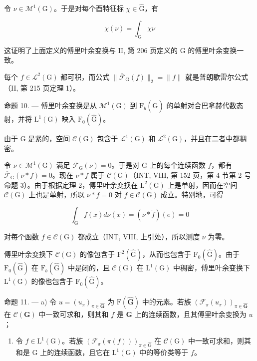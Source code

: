 令 \(\nu \in \mathcal{M}^1 (\mathrm{G})\)。于是对每个酉特征标 \(\chi \in \widehat{\mathrm{G}}\)，有

\[
\chi (\nu) = \int_ {\mathrm{G}} \chi \nu
\]

这证明了上面定义的傅里叶余变换与 II, 第 206 页定义的 G 的傅里叶余变换一致。

每个 \(f \in \mathcal{L}^2(\mathrm{G})\) 都可积，而公式 \(\| \overline{\mathcal{F}}_{\mathrm{G}}(f)\| _2 = \| f\|\) 就是普朗歇雷尔公式（II, 第 215 页定理 1）。

命题 10. --- 傅里叶余变换是从 \(\mathcal{M}^{1}(\mathrm{G})\) 到 \(\mathrm{F}_{b}(\widehat{\mathrm{G}})\) 的单射对合巴拿赫代数态射，并将 \(\mathrm{L}^{1}(\mathrm{G})\) 映入 \(\mathrm{F}_{0}(\widehat{\mathrm{G}})\)。

由于 G 是紧的，空间 \(\mathcal{C}(\mathrm{G})\) 包含于 \(\mathcal{L}^{1}(\mathrm{G})\) 和 \(\mathcal{L}^{2}(\mathrm{G})\)，并且在二者中都稠密。

令 \(\nu \in \mathcal{M}^1 (\mathrm{G})\) 满足 \(\overline{\mathcal{F}}_{\mathrm{G}}(\nu) = 0\)。于是对 G 上的每个连续函数 \(f\)，都有 \(\overline{\mathcal{F}}_{\mathrm{G}}(\nu *f) = 0\)。现在 \(\nu *f\) 属于 \(\mathcal{C}(\mathrm{G})\)（INT, VIII, 第 152 页，第 4 节第 2 号命题 3）。由于根据定理 2，傅里叶余变换在 \(\mathrm{L}^2 (\mathrm{G})\) 上是单射，因而在空间 \(\mathcal{C}(\mathrm{G})\) 上也是单射，所以 \(\nu *f = 0\) 对 \(f\in \mathcal{C}(\mathrm{G})\) 成立。特别地，可得

\[
\int_ {\mathrm{G}} f (x) d \nu (x) = (\nu * \check {f}) (e) = 0
\]

对每个函数 \(f \in \mathcal{C}(\mathrm{G})\) 都成立（INT, VIII, 上引处），所以测度 \(\nu\) 为零。

傅里叶余变换下 \(\mathcal{C}(\mathrm{G})\) 的像包含于 \(\mathrm{F}^2 (\widehat{\mathrm{G}})\)，从而也包含于 \(\mathrm{F}_0(\widehat{\mathrm{G}})\)。由于 \(\mathrm{F}_0(\widehat{\mathrm{G}})\) 在 \(\mathrm{F}_b(\widehat{\mathrm{G}})\) 中是闭的，且 \(\mathcal{C}(\mathrm{G})\) 在 \(\mathrm{L}^1 (\mathrm{G})\) 中稠密，傅里叶余变换下 \(\mathrm{L}^1 (\mathrm{G})\) 的像也包含于 \(\mathrm{F}_0(\widehat{\mathrm{G}})\)。

命题 11. --- a) 令 \(u = (u_{\pi})_{\pi \in \widehat{\mathbf{G}}}\) 为 \(\mathrm{F}(\widehat{\mathbf{G}})\) 中的元素。若族 \((\mathcal{F}_{\pi}(u_{\pi}))_{\pi \in \widehat{\mathbf{G}}}\) 在 \(\mathcal{C}(\mathbf{G})\) 中一致可求和，则其和 \(f\) 是 \(\mathbf{G}\) 上的连续函数，且其傅里叶余变换为 \(u\)；

\begin{enumerate}
\def\labelenumi{\alph{enumi})}
\setcounter{enumi}{1}
\tightlist
\item
  令 \(f \in \mathrm{L}^1(\mathrm{G})\)。若族 \((\mathcal{F}_\pi(\pi(f)))_{\pi \in \widehat{\mathrm{G}}}\) 在 \(\mathcal{C}(\mathrm{G})\) 中一致可求和，则其和是 \(\mathrm{G}\) 上的连续函数，且它在 \(\mathrm{L}^1(\mathrm{G})\) 中的等价类等于 \(f\)。
\end{enumerate}

